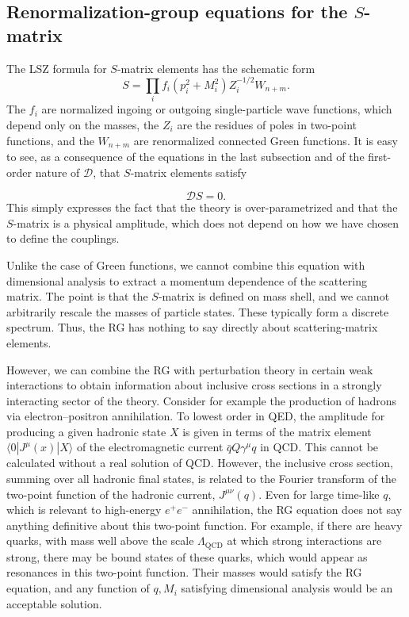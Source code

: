 \subsection{Renormalization-group equations for the $S$-matrix}

The LSZ formula for $S$-matrix elements has the schematic form
\[
  S=\prod_i f_i(p_i^2+M_i^2)Z_i^{-1/2}W_{n+m}.
\]
The $f_i$ are normalized ingoing or outgoing single-particle wave functions,
which depend only on the masses, the $Z_i$ are the residues of poles in
two-point functions, and the $W_{n+m}$ are renormalized connected Green
functions. It is easy to see, as a consequence of the equations in the last
subsection and of the first-order nature of $\mathcal{D}$, that $S$-matrix
elements satisfy

\[
  \mathcal{D}S=0.
\]
This simply expresses the fact that the theory is over-parametrized and that
the $S$-matrix is a physical amplitude, which does not depend on how we have
chosen to define the couplings.


Unlike the case of Green functions, we cannot combine this equation with
dimensional analysis to extract a momentum dependence of the scattering
matrix. The point is that the $S$-matrix is defined on mass shell, and we
cannot arbitrarily rescale the masses of particle states. These typically form
a discrete spectrum. Thus, the RG has nothing to say directly about
scattering-matrix elements.

However, we can combine the RG with perturbation theory in certain weak
interactions to obtain information about inclusive cross sections in a
strongly interacting sector of the theory. Consider for example the production
of hadrons via electron--positron annihilation. To lowest order in QED, the
amplitude for producing a given hadronic state $X$ is given in terms of the
matrix element $\langle0|J^\mu(x)|X\rangle$ of the electromagnetic current
$\bar qQ\gamma^\mu q$ in QCD. This cannot be calculated without a real solution
of QCD. However, the inclusive cross section, summing over all hadronic final
states, is related to the Fourier transform of the two-point function of the
hadronic current, $J^{\mu\nu}(q)$. Even for large time-like $q$, which is
relevant to high-energy $e^+e^-$ annihilation, the RG equation does not say
anything definitive about this two-point function. For example, if there are
heavy quarks, with mass well above the scale $\Lambda_{\mathrm{QCD}}$ at which
strong interactions are strong, there may be bound states of these quarks,
which would appear as resonances in this two-point function. Their masses
would satisfy the RG equation, and any function of $q,M_i$ satisfying
dimensional analysis would be an acceptable solution.

